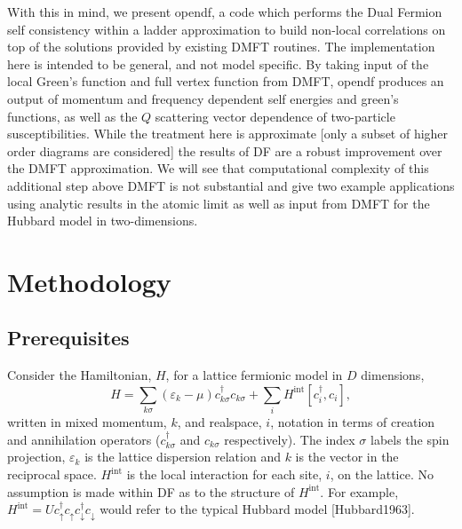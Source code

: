 \documentclass[3p,times,procedia]{elsarticle}
\begin{document}
With this in mind, we present opendf, a code which performs the Dual Fermion self consistency within a ladder approximation to build non-local correlations on top of the solutions provided by existing DMFT routines.  The implementation here is intended to be general, and not model specific.  By taking input of the local Green's function and full vertex function from DMFT, opendf produces an output of momentum and frequency dependent self energies and green's functions, as well as the $Q$ scattering vector dependence of two-particle susceptibilities.  While the treatment here is approximate [only a subset of higher order diagrams are considered] the results of DF are a robust improvement over the DMFT approximation.  We will see that computational complexity of this additional step above DMFT is not substantial and give two example applications using analytic results in the atomic limit as well as input from DMFT for the Hubbard model in two-dimensions.


\section{Methodology}
\subsection{Prerequisites}
Consider the Hamiltonian, $H$, for a lattice fermionic model in $D$ dimensions,
\begin{equation}
H = \sum_{k\sigma} (\varepsilon_k - \mu) c^\dagger_{k\sigma} c_{k\sigma} + \sum_i H^{\mathrm{int}} [c^\dagger_i, c_i],
\end{equation}
written in mixed momentum, $k$, and realspace, $i$, notation in terms of creation and annihilation operators ($c^\dagger_{k\sigma}$ and $c_{k\sigma}$ respectively).  The index $\sigma$ labels the spin projection, $\varepsilon_k$ is the lattice dispersion relation and $k$ is the vector in the reciprocal space. 
$H^{\mathrm{int}}$ is the local interaction for each site, $i$, on the lattice. 
No assumption is made within DF as to the structure of $H^{\mathrm{int}}$.  For example, $H^{\mathrm{int}} = U c^\dagger_\uparrow c_\uparrow c^\dagger_\downarrow c_\downarrow$ would refer to the typical Hubbard model [Hubbard1963]. 
\end{document}
